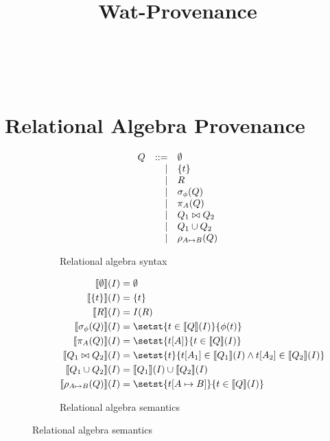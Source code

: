 \documentclass{mwhittaker}
\title{Wat-Provenance}
\author{~}
\date{~}
\begin{document}
\maketitle

\section{Relational Algebra Provenance}
\begin{figure}[h]
  \begin{subfigure}[b]{0.5\textwidth}
    \centering
    \[
      \begin{array}{rrl}
        Q & ::= & \emptyset \\
          &   | & \{t\} \\
          &   | & R \\
          &   | & \sigma_\phi(Q) \\
          &   | & \pi_A(Q) \\
          &   | & Q_1 \bowtie Q_2 \\
          &   | & Q_1 \cup Q_2 \\
          &   | & \rho_{A \mapsto B}(Q)
      \end{array}
    \]
    \caption{Relational algebra syntax}
    \label{fig:ra-syntax}
  \end{subfigure}
  \begin{subfigure}[b]{0.5\textwidth}
    \centering
    \[
      \begin{aligned}
        \denote{\emptyset}(I) &= \emptyset \\
        \denote{\set{t}}(I) &= \set{t} \\
        \denote{R}(I) &= I(R) \\
        \denote{\select_\phi(Q)}(I) &= \setst{t \in \denote{Q}(I)}{\phi(t)} \\
        \denote{\project_A(Q)}(I) &= \setst{t[A]}{t \in \denote{Q}(I)} \\
        \denote{Q_1 \join Q_2}(I) &= \setst{t}{t[A_1] \in \denote{Q_1}(I) \land t[A_2] \in \denote{Q_2}(I)} \\
        \denote{Q_1 \cup Q_2}(I) &= \denote{Q_1}(I) \cup \denote{Q_2}(I) \\
        \denote{\rename_{A \mapsto B}(Q)}(I) &= \setst{t[A \mapsto B]}{t \in \denote{Q}(I)}
      \end{aligned}
    \]
    \caption{Relational algebra semantics}
    \label{fig:ra-semantics}
  \end{subfigure}
\end{figure}
\end{document}
